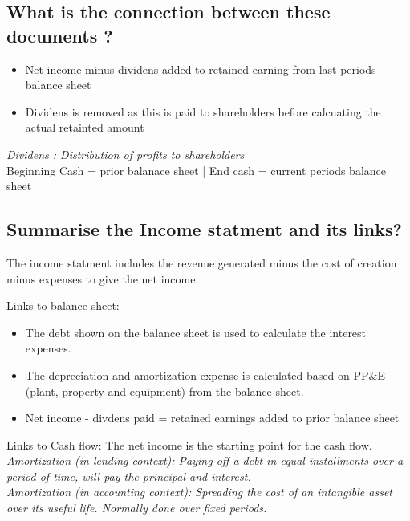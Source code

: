\documentclass[11pt]{scrartcl} %
\begin{document}
\subsection{What is the connection between these documents ?}

\begin{itemize}
	\item Net income minus dividens added to retained earning from last periods balance sheet
	\item Dividens is removed as this is paid to shareholders before calcuating the actual retainted amount
\end{itemize}
  
\textit{Dividens : Distribution of profits to shareholders} \\

Beginning Cash = prior balanace sheet | End cash = current periods balance sheet

\subsection{Summarise the Income statment and its links?}

The income statment includes the revenue generated minus the cost of creation minus expenses to give the net income.

Links to balance sheet:

\begin{itemize}
	\item The debt shown on the balance sheet is used to calculate the interest expenses. 
	\item The depreciation and amortization expense is calculated based on PP\&E (plant, property and equipment) from the balance sheet.
	\item Net income - divdens paid = retained earnings added to prior balance sheet
\end{itemize}

Links to Cash flow: The net income is the starting point for the cash flow.\\

\textit{Amortization (in lending context): Paying off a debt in equal installments over a period of time, will pay the principal and interest.}\\

\textit{Amortization (in accounting context): Spreading the cost of an intangible asset over its useful life. Normally done over fixed periods.}\\
\end{document}
